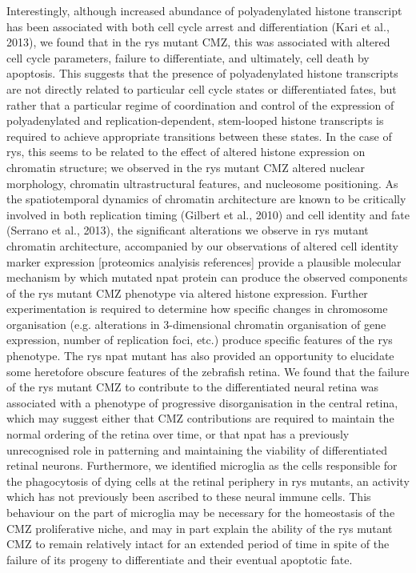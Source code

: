 Interestingly, although increased abundance of polyadenylated histone transcript has been associated with both cell cycle arrest and differentiation (Kari et al., 2013), we found that in the rys mutant CMZ, this was associated with altered cell cycle parameters, failure to differentiate, and ultimately, cell death by apoptosis. This suggests that the presence of polyadenylated histone transcripts are not directly related to particular cell cycle states or differentiated fates, but rather that a particular regime of coordination and control of the expression of polyadenylated and replication-dependent, stem-looped histone transcripts is required to achieve appropriate transitions between these states. In the case of rys, this seems to be related to the effect of altered histone expression on chromatin structure; we observed in the rys mutant CMZ altered nuclear morphology, chromatin ultrastructural features, and nucleosome positioning. As the spatiotemporal dynamics of chromatin architecture are known to be critically involved in both replication timing (Gilbert et al., 2010) and cell identity and fate (Serrano et al., 2013), the significant alterations we observe in rys mutant chromatin architecture, accompanied by our observations of altered cell identity marker expression [proteomics analyisis references] provide a plausible molecular mechanism by which mutated npat protein can produce the observed components of the rys mutant CMZ phenotype via altered histone expression. Further experimentation is required to determine how specific changes in chromosome organisation (e.g. alterations in 3-dimensional chromatin organisation of gene expression, number of replication foci, etc.) produce specific features of the rys phenotype. 
The rys npat mutant has also provided an opportunity to elucidate some heretofore obscure features of the zebrafish retina. We found that the failure of the rys mutant CMZ to contribute to the differentiated neural retina was associated with a phenotype of progressive disorganisation in the central retina, which may suggest either that CMZ contributions are required to maintain the normal ordering of the retina over time, or that npat has a previously unrecognised role in patterning and maintaining the viability of differentiated retinal neurons. Furthermore, we identified microglia as the cells responsible for the phagocytosis of dying cells at the retinal periphery in rys mutants, an activity which has not previously been ascribed to these neural immune cells. This behaviour on the part of microglia may be necessary for the homeostasis of the CMZ proliferative niche, and may in part explain the ability of the rys mutant CMZ to remain relatively intact for an extended period of time in spite of the failure of its progeny to differentiate and their eventual apoptotic fate. 